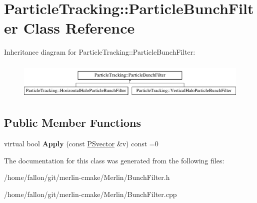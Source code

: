 \hypertarget{classParticleTracking_1_1ParticleBunchFilter}{}\section{Particle\+Tracking\+:\+:Particle\+Bunch\+Filter Class Reference}
\label{classParticleTracking_1_1ParticleBunchFilter}
Inheritance diagram for Particle\+Tracking\+:\+:Particle\+Bunch\+Filter\+:\begin{figure}[H]
\begin{center}
\leavevmode
\includegraphics[height=1.812298cm]{classParticleTracking_1_1ParticleBunchFilter}
\end{center}
\end{figure}
\subsection*{Public Member Functions}
\begin{DoxyCompactItemize}
\item 
\mbox{\label{classParticleTracking_1_1ParticleBunchFilter_a33fa2ab62a13592ef5d4c21fe6c69106}} 
virtual bool {\bfseries Apply} (const \hyperlink{classPSvector}{P\+Svector} \&v) const =0
\end{DoxyCompactItemize}


The documentation for this class was generated from the following files\+:\begin{DoxyCompactItemize}
\item 
/home/fallon/git/merlin-\/cmake/\+Merlin/Bunch\+Filter.\+h\item 
/home/fallon/git/merlin-\/cmake/\+Merlin/Bunch\+Filter.\+cpp\end{DoxyCompactItemize}
